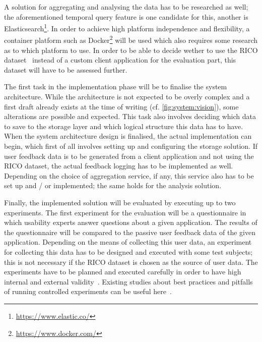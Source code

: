 A solution for aggregating and analysing the data has to be researched as well; the aforementioned temporal query feature is one candidate for this, another is Elasticsearch\footnote{\url{https://www.elastic.co/}}.
In order to achieve high platform independence and flexibility, a container platform such as Docker\footnote{\url{https://www.docker.com/}} will be used which also requires some research as to which platform to use.
In order to be able to decide wether to use the RICO dataset~\cite{Deka:2017:Rico} instead of a custom client application for the evaluation part, this dataset will have to be assessed further.

The first task in the implementation phase will be to finalise the system architecture.
While the architecture is not expected to be overly complex and a first draft already exists at the time of writing (cf. \cref{fig:system:vision}), some alterations are possible and expected.
This task also involves deciding which data to save to the storage layer and which logical structure this data has to have.
When the system architecture design is finalised, the actual implementation can begin, which first of all involves setting up and configuring the storage solution.
If user feedback data is to be generated from a client application and not using the RICO dataset, the actual feedback logging has to be implemented as well.
Depending on the choice of aggregation service, if any, this service also has to be set up and / or implemented; the same holds for the analysis solution.

Finally, the implemented solution will be evaluated by executing up to two experiments.
The first experiment for the evaluation will be a questionnaire in which usability experts answer questions about a given application.
The results of the questionnaire will be compared to the passive user feedback data of the given application.
Depending on the means of collecting this user data, an experiment for collecting this data has to be designed and executed with some test subjects; this is not necessary if the RICO dataset is chosen as the source of user data.
The experiments have to be planned and executed carefully in order to have high internal and external validity~\cite{Huitt2010}.
Existing studies about best practices and pitfalls of running controlled experiments can be useful here~\cite{Kohavi2009}.

